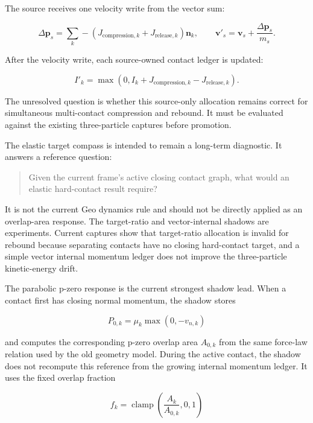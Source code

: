 The source receives one velocity write from the vector sum:

\begin{equation}
\Delta\mathbf{p}_s
=
\sum_k
-(J_{\mathrm{compression},k}+J_{\mathrm{release},k})\mathbf{n}_k,
\qquad
\mathbf{v}'_s=\mathbf{v}_s+\frac{\Delta\mathbf{p}_s}{m_s}.
\end{equation}

After the velocity write, each source-owned contact ledger is updated:

\begin{equation}
I'_k
=
\max(0,I_k+J_{\mathrm{compression},k}-J_{\mathrm{release},k}).
\end{equation}

The unresolved question is whether this source-only allocation remains correct
for simultaneous multi-contact compression and rebound.  It must be evaluated
against the existing three-particle captures before promotion.

The elastic target compass is intended to remain a long-term diagnostic.  It
answers a reference question:

\begin{quote}
Given the current frame's active closing contact graph, what would an elastic
hard-contact result require?
\end{quote}

It is not the current Geo dynamics rule and should not be directly applied as
an overlap-area response.  The target-ratio and vector-internal shadows are
experiments.  Current captures show that target-ratio allocation is invalid for
rebound because separating contacts have no closing hard-contact target, and a
simple vector internal momentum ledger does not improve the three-particle
kinetic-energy drift.

The parabolic p-zero response is the current strongest shadow lead.  When a
contact first has closing normal momentum, the shadow stores

\begin{equation}
P_{0,k} = \mu_k \max(0,-v_{n,k})
\end{equation}

and computes the corresponding p-zero overlap area \(A_{0,k}\) from the same
force-law relation used by the old geometry model.  During the active contact,
the shadow does not recompute this reference from the growing internal
momentum ledger.  It uses the fixed overlap fraction

\begin{equation}
f_k = \operatorname{clamp}\left(\frac{A_k}{A_{0,k}},0,1\right)
\end{equation}

